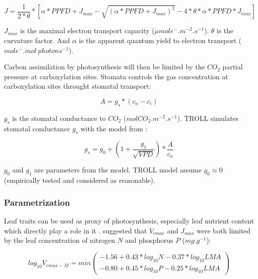 \documentclass[]{article}
\theoremstyle{definition}
\theoremstyle{definition}
\theoremstyle{remark}
\begin{document}
\begin{equation}
  J = \frac{1}{2*\theta}*[\alpha*PPFD+J_{max}-\sqrt{(\alpha*PPFD+J_{max})^2}-4*\theta*\alpha*PPFD*J_{max}]
  \label{eq:J}
\end{equation}

\(J_{max}\) is the maximal electron transport capacity
(\(\mu mol e^-.m^{-2}.s^{-1}\)). \(\theta\) is the curvature factor. And
\(\alpha\) is the apparent quantum yield to electron transport
(\(mole^-.mol~photons^{-1}\)).

Carbon assimilation by photosynthesis will then be limited by the
\(CO_2\) partial pressure at carboxylation sites. Stomata controls the
gas concentration at carboxylation sites throught stomatal transport:

\begin{equation}
  A = g_s*(c_a-c_i)
  \label{eq:Ag}
\end{equation}

\(g_s\) is the stomatal conductance to \(CO_2\)
(\(molCO_2.m^{-2}.s^{-1}\)). TROLL simulates stomatal conductance
\(g_s\) with the model from \citep{Medlyn2011}:

\begin{equation}
  g_s = g_0 + (1 + \frac{g_1}{\sqrt{VPD}})*\frac{A}{c_a}
  \label{eq:gs}
\end{equation}

\(g_0\) and \(g_1\) are parameters from the model. TROLL model assume
\(g_0 \approx 0\) (empirically tested and considered as reasonable).

\subsubsection{Parametrization}\label{parametrization}

Leaf traits can be used as proxy of photosynthesis, especially leaf
nutrient content which directly play a role in it
\citep{wright_worldwide_2004}. \citet{Domingues2010} suggested that
\(V_{cmac}\) and \(J_{max}\) were both limited by the leaf concentration
of nitrogen \(N\) and phosphorus \(P\) (\(mg.g^{-1}\)):

\begin{equation}
  log_{10} V_{cmax-M} = min( 
  \begin{array}{c} 
    -1.56+0.43*log_{10} N-0.37*log_{10} LMA \\
    -0.80+0.45*log_{10} P-0.25*log_{10} LMA 
  \end{array} 
  )
  \label{eq:VcmaxM}
\end{equation}
\end{document}
